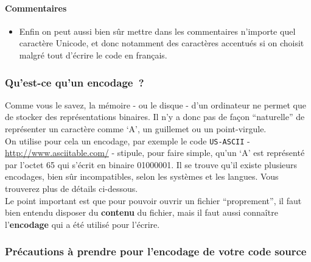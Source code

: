     \hypertarget{commentaires}{%
\paragraph{Commentaires}\label{commentaires}}

    \begin{itemize}
\tightlist
\item
  Enfin on peut aussi bien sûr mettre dans les commentaires n'importe
  quel caractère Unicode, et donc notamment des caractères accentués si
  on choisit malgré tout d'écrire le code en français.
\end{itemize}

    \begin{Shaded}
\begin{Highlighting}[]
\end{Highlighting}
\end{Shaded}

    \hypertarget{quest-ce-quun-encodage}{%
\subsubsection{Qu'est-ce qu'un
encodage~?}\label{quest-ce-quun-encodage}}

    Comme vous le savez, la mémoire - ou le disque - d'un ordinateur ne
permet que de stocker des représentations binaires. Il n'y a donc pas de
façon ``naturelle'' de représenter un caractère comme `A', un guillemet
ou un point-virgule.\\

On utilise pour cela un encodage, par exemple le code \texttt{US-ASCII}
- \href{http://www.asciitable.com/}{http://www.asciitable.com/} - stipule, pour faire simple, qu'un `A' est
représenté par l'octet 65 qui s'écrit en binaire 01000001. Il se trouve
qu'il existe plusieurs encodages, bien sûr incompatibles, selon les
systèmes et les langues. Vous trouverez plus de détails ci-dessous.\\

Le point important est que pour pouvoir ouvrir un fichier
``proprement'', il faut bien entendu disposer du \textbf{contenu} du
fichier, mais il faut aussi connaître l'\textbf{encodage} qui a été
utilisé pour l'écrire.

    \hypertarget{pruxe9cautions-uxe0-prendre-pour-lencodage-de-votre-code-source}{%
\subsubsection{Précautions à prendre pour l'encodage de votre code
source}\label{pruxe9cautions-uxe0-prendre-pour-lencodage-de-votre-code-source}}

